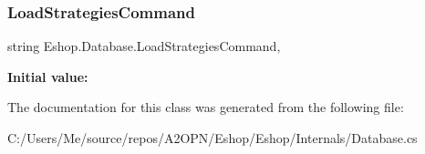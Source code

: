 \subsubsection{\texorpdfstring{LoadStrategiesCommand}{LoadStrategiesCommand}}
{\footnotesize\ttfamily string Eshop.\+Database.\+Load\+Strategies\+Command\hspace{0.3cm}{\ttfamily [static]}, {\ttfamily [get]}}

{\bfseries Initial value\+:}
\begin{DoxyCode}{0}
\DoxyCodeLine{=}

\end{DoxyCode}


The documentation for this class was generated from the following file\+:\begin{DoxyCompactItemize}
\item 
C\+:/\+Users/\+Me/source/repos/\+A2\+O\+P\+N/\+Eshop/\+Eshop/\+Internals/Database.\+cs\end{DoxyCompactItemize}
